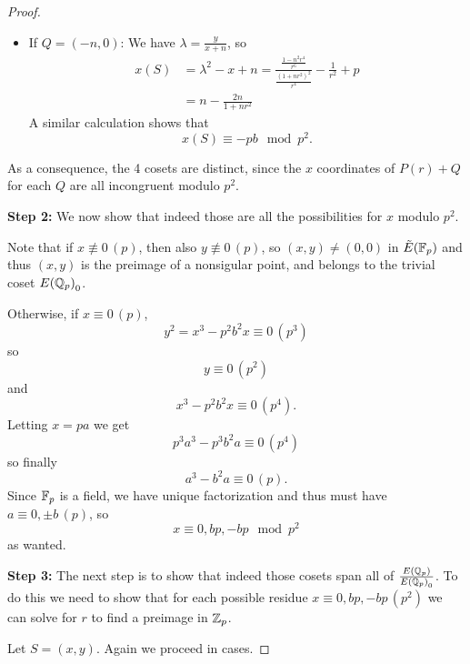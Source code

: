 \documentclass[12pt, a4paper]{amsart}
\begin{document}
\begin{proof}
\begin{itemize}
  \item If $Q = (-n, 0)$: We have $\lambda = \frac{y}{x+n}$, so
  \begin{equation*}
    \begin{split}
      x(S)
      &= \lambda^2 - x + n = 
      \frac{\frac{1 - n^2r^4}{r^6}}{\frac{(1+nr^2)^2}{r^4}} -
      \frac{1}{r^2} + p \\
      &= n - \frac{2n}{1+nr^2}
    \end{split}
  \end{equation*}
  A similar calculation shows that 
  \[x(S) \equiv -pb \mod{p^2}.\]
  \end{itemize}

  As a consequence, the 4 cosets are distinct, since the $x$ coordinates of
  $P(r) + Q$ for each $Q$ are all incongruent modulo $p^2$.

  \textbf{Step 2:} We now show that indeed those are all the possibilities for $x$ modulo $p^2$.

  Note that if $x \not\equiv 0 \, (p)$, then also $y \not\equiv 0 \, (p)$, so
  $(x,y) \neq (0,0)$ in ${\tilde{E}(\mathbb{F}_p)}$ and thus $(x,y)$ is the preimage of a nonsigular
  point, and belongs to the trivial coset ${E({\mathbb Q}_p)}_0$.

  Otherwise, if $x \equiv 0 \, (p)$,
  \[y^2 = x^3 - p^2b^2x\equiv 0 \,(p^3)\]
  so
  \[y \equiv 0 \, (p^2)\]
  and
  \[ x^3-p^2b^2x \equiv 0 \, (p^4).\]
  Letting $x = pa$ we get
  \[p^3a^3-p^3b^2a \equiv 0 \, (p^4)\]
  so finally
  \[a^3 - b^2a \equiv 0 \, (p).\]
  Since $\mathbb{F}_p$ is a field, we have unique factorization and thus must have
  $a \equiv 0, \pm b \, (p)$, so
  \[x \equiv 0, bp, -bp \mod{p^2}\]
  as wanted.

  \textbf{Step 3:} The next step is to show that indeed those cosets span all of
  $\frac{{E({\mathbb Q}_p)}}{{E({\mathbb Q}_p)}_0}$. To do this we need to show that for each possible
  residue $x \equiv 0, bp, -bp \, (p^2)$ we can solve for $r$ to find a preimage
  in ${\mathbb Z}_p$.

  Let $S = (x,y).$ Again we proceed in cases.


\end{proof}
\end{document}
